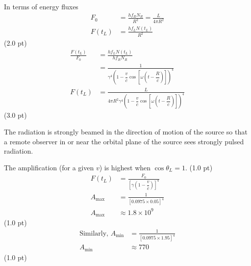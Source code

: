 \begin{description}
  In terms of energy fluxes
  \begin{align*}
    F_0 &= \frac{hf_R N_R}{R^2} = \frac{L}{4\pi R^2}\\
    F(t_L) &= \frac{hf_L N(t_L)}{R^2}
  \end{align*}
  \hfill(2.0 pt)
  \begin{align*}
    \frac{F(t_L)}{F_0} &= \frac{hf_L N(t_L)}{hf_R N_R}\\
      &= \frac{1}{\gamma^4\left(1 - \dfrac{v}{c}
         \cos\left[\omega\left(t - \dfrac{R}{c}\right)\right]\right)^4}\\
    F(t_L) &= \frac{L}{4\pi R^2\gamma^4\left(1 - \dfrac{v}{c}
      \cos\left[\omega\left(t - \dfrac{R}{c}\right)\right]\right)^4}
  \end{align*}
  \hfill(3.0 pt)

  The radiation is strongly beamed in the direction of motion of the source
  so that a remote observer in or near the orbital plane of the source sees
  strongly pulsed radiation.
\item[(f)] The amplification (for a given $v$) is highest when
  $\cos\theta_L = 1$. \hfill(1.0 pt)
  \begin{align*}
    F(t_L) &= \frac{F_0}{\left[\gamma\left(1 - \dfrac{v}{c}\right)\right]^4}\\
    A_{\max} &= \frac{1}{\left[0.0975 \times 0.05\right]^4}\\
    A_{\max} &\approx 1.8 \times 10^9
  \end{align*}
  \hfill(1.0 pt)
  \begin{align*}
    \text{Similarly, } A_{\min}
      &= \frac{1}{\left[0.0975 \times 1.95\right]^4}\\
    A_{\min} &\approx 770
  \end{align*}
  \hfill(1.0 pt)
\end{description}
